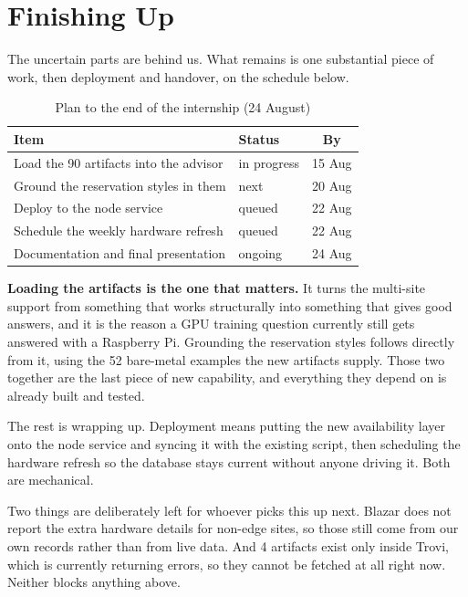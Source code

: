 \documentclass[conference]{IEEEtran}
\begin{document}
\section{Finishing Up}

The uncertain parts are behind us. What remains is one substantial piece of
work, then deployment and handover, on the schedule below.

\begin{table}[h]
\caption{Plan to the end of the internship (24 August)}
\label{tab:plan}
\centering\footnotesize
\begin{tabular}{@{}llc@{}}
\toprule
Item & Status & By \\
\midrule
Load the 90 artifacts into the advisor & in progress & 15 Aug \\
Ground the reservation styles in them  & next        & 20 Aug \\
Deploy to the node service             & queued      & 22 Aug \\
Schedule the weekly hardware refresh   & queued      & 22 Aug \\
Documentation and final presentation   & ongoing     & 24 Aug \\
\bottomrule
\end{tabular}
\end{table}

\textbf{Loading the artifacts is the one that matters.} It turns the multi-site
support from something that works structurally into something that gives good
answers, and it is the reason a GPU training question currently still gets
answered with a Raspberry Pi. Grounding the reservation styles follows directly
from it, using the 52 bare-metal examples the new artifacts supply. Those two
together are the last piece of new capability, and everything they depend on is
already built and tested.

The rest is wrapping up. Deployment means putting the new availability layer
onto the node service and syncing it with the existing script, then scheduling
the hardware refresh so the database stays current without anyone driving it.
Both are mechanical.

Two things are deliberately left for whoever picks this up next. Blazar does
not report the extra hardware details for non-edge sites, so those still come
from our own records rather than from live data. And 4 artifacts exist only
inside Trovi, which is currently returning errors, so they cannot be fetched at
all right now. Neither blocks anything above.
\end{document}
